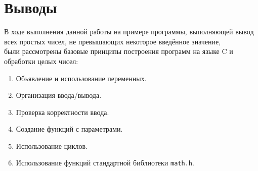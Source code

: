 \section{Выводы}

В ходе выполнения данной работы на примере программы, выполняющей
вывод всех простых чисел, не превышающих некоторое введённое значение, \\
были рассмотрены базовые принципы построения программ на языке C и обработки целых чисел:

\begin{enumerate}
  \item Объявление и использование переменных.
  \item Организация ввода/вывода.
  \item Проверка корректности ввода.
  \item Создание функций с параметрами.
  \item Использование циклов.
  \item Использование функций стандартной библиотеки \texttt{math.h}.
\end{enumerate}
